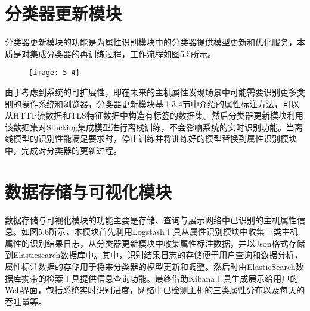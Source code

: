 \section{分类器更新模块}

分类器更新模块的功能是为属性识别模块中的分类器提供模型更新和优化服务，本质是对集成分类器的再训练过程，工作流程如图5.5所示。

\begin{figure}[!htbp]
    \centering
    \texttt{[image: 5-4]}
    \label{fig:5-4}
\end{figure}

由于考虑到系统的可扩展性，即在未来的主机属性发现场景中可能需要识别更多类别的操作系统和浏览器，分类器更新模块基于3.4节中介绍的属性标注方法，可以从HTTP流数据和TLS特征数据中构造有标签的数据集。然后分类器更新模块利用该数据集对Stacking集成模型进行离线训练，不会影响系统的实时识别功能。当离线模型的识别性能满足要求时，停止训练并将训练好的模型替换到属性识别模块中，完成对分类器的更新过程。



\section{数据存储与可视化模块}

数据存储与可视化模块的功能主要是存储、查询与展示网络中已识别的主机属性信息。如图5.6所示，本模块首先利用Logstash工具从属性识别模块中收集三类主机属性的识别结果日志，从分类器更新模块中收集属性标注数据，并以Json格式存储到Elasticsearch数据库中。其中，识别结果日志的存储便于用户查询和数据分析，属性标注数据的存储用于将来分类器的模型更新和调整。然后时由ElasticSearch数据库携带的检索工具提供信息查询功能。最终借助Kibana工具生成展示给用户的Web界面，包括系统实时识别进度，网络中已检测主机的三类属性分布以及每天的吞吐量等。

